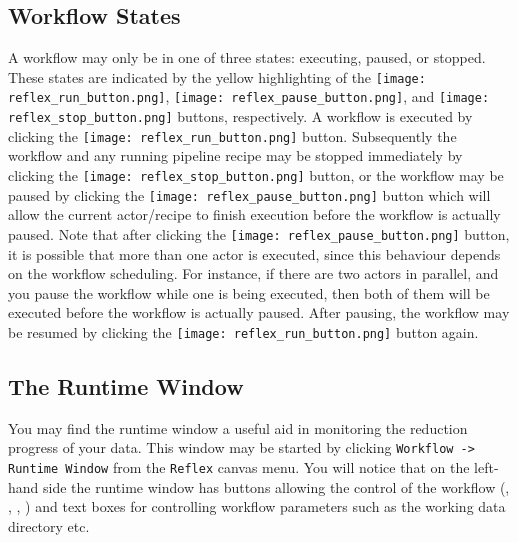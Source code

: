 \subsection{Workflow States}

A workflow may only be in one of three states: executing, paused, or stopped.
 These states are indicated by the yellow highlighting of the
\texttt{[image: reflex\_run\_button.png]},
\texttt{[image: reflex\_pause\_button.png]},
and \texttt{[image: reflex\_stop\_button.png]}
buttons, respectively. A workflow is executed by clicking the
\texttt{[image: reflex\_run\_button.png]} button. 
Subsequently the workflow and any running
pipeline recipe may be stopped immediately by clicking the
\texttt{[image: reflex\_stop\_button.png]}
button, or the workflow may be paused by clicking the 
\texttt{[image: reflex\_pause\_button.png]} button which
will allow the current actor/recipe to finish execution before the workflow is 
actually paused. Note that after clicking the
\texttt{[image: reflex\_pause\_button.png]} button, 
it is possible that more than one actor is executed, since this behaviour 
depends on the workflow scheduling. For instance, if there are two actors in 
parallel, and you pause the workflow while one is being executed, then both
of them will be executed before the workflow is actually paused. After pausing,
the workflow may be resumed by clicking the
\texttt{[image: reflex\_run\_button.png]} button again.

\subsection{The Runtime Window}

You may find the runtime window a useful aid in monitoring the
reduction progress of your data. This window may be started by
clicking {\tt Workflow -> Runtime Window} from the {\tt Reflex} canvas
menu. You will notice that on the left-hand side the runtime window
has buttons allowing the control of the workflow (,
, , ) and text boxes
for controlling workflow parameters such as the working data directory
etc.


